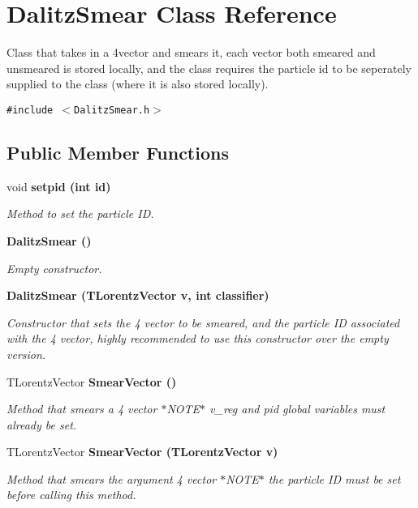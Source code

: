 \section{Dalitz\-Smear Class Reference}
\label{classDalitzSmear}
Class that takes in a 4vector and smears it, each vector both smeared and unsmeared is stored locally, and the class requires the particle id to be seperately supplied to the class (where it is also stored locally).  


{\tt \#include $<$Dalitz\-Smear.h$>$}

\subsection*{Public Member Functions}
\begin{CompactItemize}
\item 
void \bf{setpid} (int id)
\begin{CompactList}\small\item\em Method to set the particle ID. \item\end{CompactList}\item 
\bf{Dalitz\-Smear} ()
\begin{CompactList}\small\item\em Empty constructor. \item\end{CompactList}\item 
\bf{Dalitz\-Smear} (TLorentz\-Vector v, int classifier)
\begin{CompactList}\small\item\em Constructor that sets the 4 vector to be smeared, and the particle ID associated with the 4 vector, highly recommended to use this constructor over the empty version. \item\end{CompactList}\item 
TLorentz\-Vector \bf{Smear\-Vector} ()
\begin{CompactList}\small\item\em Method that smears a 4 vector $\ast$NOTE$\ast$ v\_\-reg and pid global variables must already be set. \item\end{CompactList}\item 
TLorentz\-Vector \bf{Smear\-Vector} (TLorentz\-Vector v)
\begin{CompactList}\small\item\em Method that smears the argument 4 vector $\ast$NOTE$\ast$ the particle ID must be set before calling this method. \item\end{CompactList}\item 

\end{CompactItemize}
